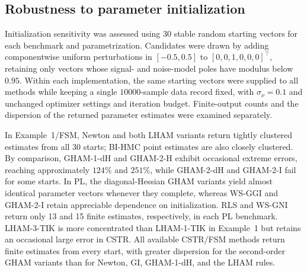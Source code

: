 \subsection{Robustness to parameter initialization}
\label{subsec:experimental_initialization_statistics}
Initialization sensitivity was assessed using 30 stable random starting vectors for each benchmark and parametrization. Candidates were drawn by adding componentwise uniform perturbations in $[-0.5,0.5]$ to $[0,0,1,0,0,0]^\top$, retaining only vectors whose signal- and noise-model poles have modulus below $0.95$. Within each implementation, the same starting vectors were supplied to all methods while keeping a single $10000$-sample data record fixed, with $\sigma_\nu=0.1$ and unchanged optimizer settings and iteration budget. Finite-output counts and the dispersion of the returned parameter estimates were examined separately.

In Example~1/FSM, Newton and both LHAM variants return tightly clustered estimates from all 30 starts; BI-HMC point estimates are also closely clustered. By comparison, GHAM-1-dH and GHAM-2-H exhibit occasional extreme errors, reaching approximately $124\%$ and $251\%$, while GHAM-2-dH and GHAM-2-I fail for some starts. In PL, the diagonal-Hessian GHAM variants yield almost identical parameter vectors whenever they complete, whereas WS-GGI and GHAM-2-I retain appreciable dependence on initialization. RLS and WS-GNI return only 13 and 15 finite estimates, respectively, in each PL benchmark. LHAM-3-TIK is more concentrated than LHAM-1-TIK in Example~1 but retains an occasional large error in CSTR. All available CSTR/FSM methods return finite estimates from every start, with greater dispersion for the second-order GHAM variants than for Newton, GI, GHAM-1-dH, and the LHAM rules.
